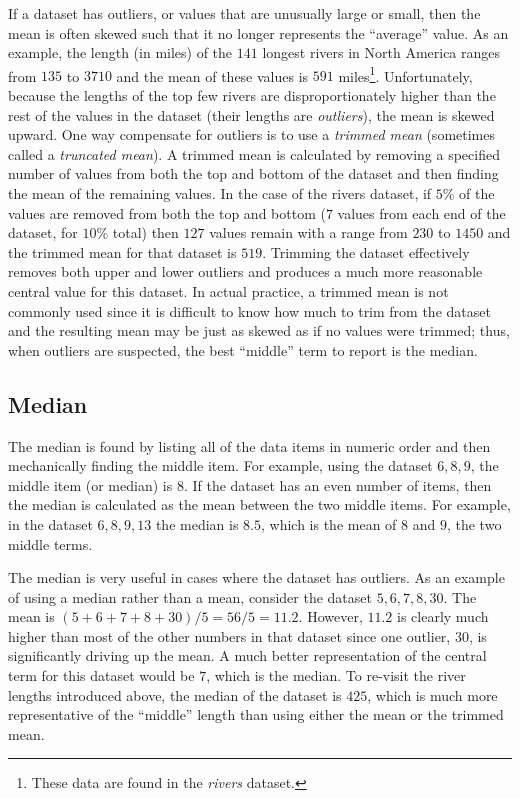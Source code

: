 If a dataset has outliers, or values that are unusually large or small, then the mean is often skewed such that it no longer represents the ``average'' value. As an example, the length (in miles) of the $ 141 $ longest rivers in North America ranges from $ 135 $ to $ 3710 $ and the mean of these values is $ 591 $ miles\footnote{These data are found in the \textit{rivers} dataset.}. Unfortunately, because the lengths of the top few rivers are disproportionately higher than the rest of the values in the dataset (their lengths are \textit{outliers}), the mean is skewed upward. One way compensate for outliers is to use a \textit{trimmed mean} (sometimes called a \textit{truncated mean}). A trimmed mean is calculated by removing a specified number of values from both the top and bottom of the dataset and then finding the mean of the remaining values. In the case of the rivers dataset, if $ 5\% $ of the values are removed from both the top and bottom ($ 7 $ values from each end of the dataset, for $ 10\% $ total) then $ 127 $ values remain with a range from $ 230 $ to $ 1450 $ and the trimmed mean for that dataset is $ 519 $. Trimming the dataset effectively removes both upper and lower outliers and produces a much more reasonable central value for this dataset. In actual practice, a trimmed mean is not commonly used since it is difficult to know how much to trim from the dataset and the resulting mean may be just as skewed as if no values were trimmed; thus, when outliers are suspected, the best ``middle'' term to report is the median.

\subsection{Median}\label{cen:median}

The median is found by listing all of the data items in numeric order and then mechanically finding the middle item. For example, using the dataset $ 6, 8, 9 $, the middle item (or median) is $ 8 $. If the dataset has an even number of items, then the median is calculated as the mean between the two middle items. For example, in the dataset $ 6, 8, 9, 13 $ the median is $ 8.5 $, which is the mean of $ 8 $ and $ 9 $, the two middle terms.

The median is very useful in cases where the dataset has outliers. As an example of using a median rather than a mean, consider the dataset $ 5, 6, 7, 8, 30 $. The mean is $ (5+6+7+8+30)/5 = 56/5 = 11.2 $. However, $ 11.2 $ is clearly much higher than most of the other numbers in that dataset since one outlier, $ 30 $, is significantly driving up the mean. A much better representation of the central term for this dataset would be $ 7 $, which is the median. To re-visit the river lengths introduced above, the median of the dataset is $ 425 $, which is much more representative of the ``middle'' length than using either the mean or the trimmed mean.

